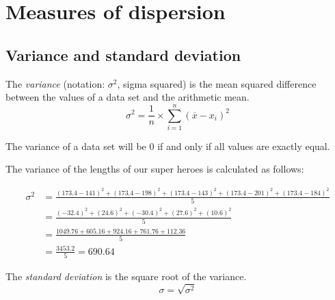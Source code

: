 \section{Measures of dispersion}
\label{sec:measures-of-dispersion}

\subsection{Variance and standard deviation}
\label{ssec:variance-and-standard-deviation}

\begin{definition}[Variance]
  The \emph{variance} (notation: $\sigma^{2}$, sigma squared) is the mean squared difference between the values of a data set and the arithmetic mean.
  \begin{equation}
  \sigma^{2} = \frac{1}{n} \times \sum_{i=1}^{n} \left( \overline{x} - x_i \right)^{2}
  \label{eq:variance}
  \end{equation}
\end{definition}

The variance of a data set will be 0 if and only if all values are exactly equal.

\begin{example}
  The variance of the lengths of our super heroes is calculated as follows:
  
  \begin{equation}
  \begin{aligned}
  \sigma^{2} &= \frac{(173.4-141)^{2} + (173.4 - 198 )^{2} + (173.4 - 143)^{2} + (173.4- 201)^{2} + (173.4 - 184 )^{2}}{5} \\
             &= \frac{(-32.4)^{2} + (24.6)^{2} + (-30.4)^{2}+ (27.6)^{2} + (10.6)^{2}}{5}\\
             &= \frac{1049.76 + 605.16 + 924.16 + 761.76 + 112.36}{5}\\
             &= \frac{3453.2}{5} = 690.64
  \end{aligned}
  \end{equation}
\end{example}

\begin{definition}
  The \emph{standard deviation} is the square root of the variance.
  \begin{equation}
  \sigma = \sqrt{\sigma^{2}}
  \label{eq:stdev}
  \end{equation}
\end{definition}

